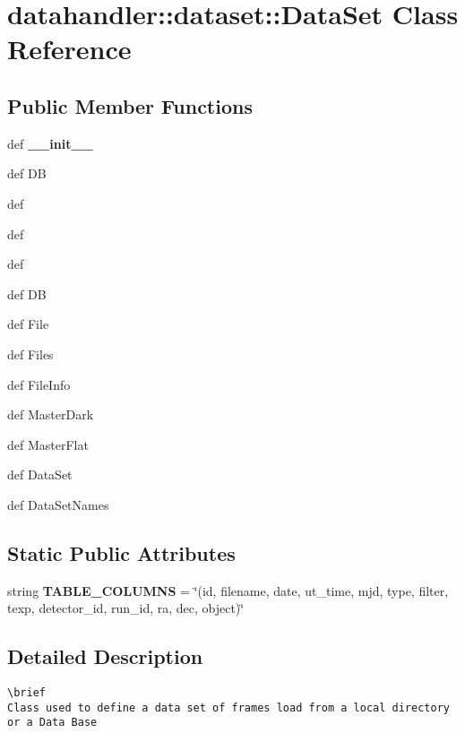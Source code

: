 \section{datahandler::dataset::Data\-Set Class Reference}
\label{classdatahandler_1_1dataset_1_1DataSet}
\subsection*{Public Member Functions}
\begin{CompactItemize}
\item 
def {\bf\_\-\_\-init\_\-\_\-}
\item 
def {\bfcreate\-DB}
\item 
def {\bfload}
\item 
def {\bfinsert}
\item 
def {\bfdelete}
\item 
def {\bfclear\-DB}
\item 
def {\bfGet\-File}
\item 
def {\bfGet\-Files}
\item 
def {\bfGet\-File\-Info}
\item 
def {\bfGet\-Master\-Dark}
\item 
def {\bfGet\-Master\-Flat}
\item 
def {\bfList\-Data\-Set}
\item 
def {\bfList\-Data\-Set\-Names}
\end{CompactItemize}
\subsection*{Static Public Attributes}
\begin{CompactItemize}
\item 
string \textbf{TABLE\_\-COLUMNS} = \char`\"{}(id, filename, date, ut\_\-time, mjd, type, filter, texp, detector\_\-id, run\_\-id, ra, dec, object)\char`\"{}\label{classdatahandler_1_1dataset_1_1DataSet_cda2c5bfc10cfe3203b4ad3f8b23cce7}

\end{CompactItemize}


\subsection{Detailed Description}


\footnotesize\begin{verbatim}
\brief
Class used to define a data set of frames load from a local directory or a Data Base  
\end{verbatim}
\normalsize
 



